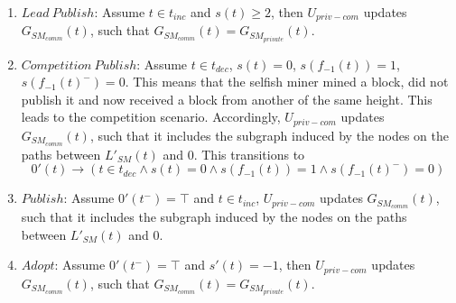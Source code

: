 \begin{enumerate}
\item $Lead~Publish$: Assume $t \in t_{inc}$ and $s(t) \geq 2$, then $U_{priv-com}$ updates $G_{SM_{comm}}(t)$, such that $G_{SM_{comm}}(t) = G_{SM_{private}}(t)$. 
\item $Competition~Publish$: Assume $t \in t_{dec}$, $s(t) = 0$, $s(f_{-1}(t)) = 1$, $s(f_{-1}(t)^-) = 0$. This means that the selfish miner mined a block, did not publish it and now received a block from another of the same height. This leads to the competition scenario. Accordingly, $U_{priv-com}$ updates $G_{SM_{comm}}(t)$, such that it includes the subgraph induced by the nodes on the paths between $L'_{SM}(t)$ and ${0}$. This transitions to 
\begin{equation}
0'(t) \rightarrow \left( t \in t_{dec} \wedge s(t) = 0 \wedge s(f_{-1}(t)) = 1 \wedge s(f_{-1}(t)^-) = 0\right)
\end{equation}
\item $Publish$: Assume $0'(t^-)=\top$ and $t \in t_{inc}$, $U_{priv-com}$ updates $G_{SM_{comm}}(t)$, such that it includes the subgraph induced by the nodes on the paths between $L'_{SM}(t)$ and ${0}$.
\item $Adopt$: Assume $0'(t^-)=\top$ and $s'(t)=-1$, then $U_{priv-com}$ updates $G_{SM_{comm}}(t)$, such that $G_{SM_{comm}}(t) = G_{SM_{private}}(t)$. 

\end{enumerate}









